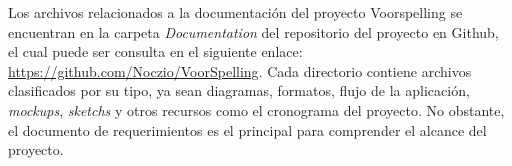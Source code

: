 Los archivos relacionados a la documentación del proyecto Voorspelling se encuentran en la carpeta \textit{Documentation} del repositorio del proyecto en Github, el cual puede ser consulta en el siguiente enlace: \url{https://github.com/Noczio/VoorSpelling}. Cada directorio contiene archivos clasificados por su tipo, ya sean diagramas, formatos, flujo de la aplicación, \textit{mockups}, \textit{sketchs} y otros recursos como el cronograma del proyecto. No obstante, el documento de requerimientos es el principal para comprender el alcance del proyecto.

